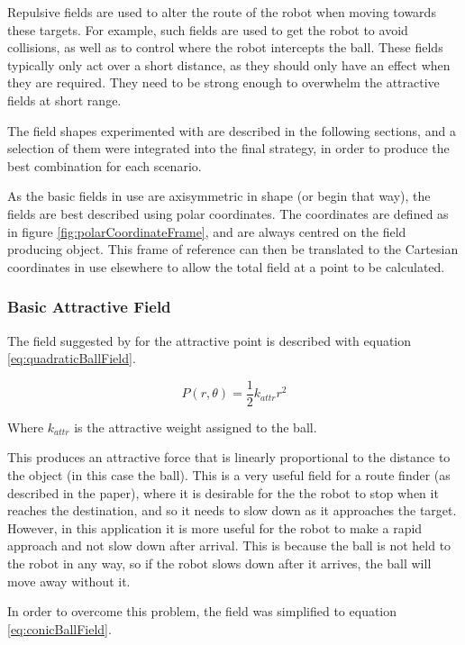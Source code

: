 \documentclass[10pt]{article} \usepackage[a4paper]{geometry}
\begin{document}
Repulsive fields are used to alter the route of the robot when moving towards
these targets. For example, such fields are used to get the robot to avoid
collisions, as well as to control where the robot intercepts the ball. These
fields typically only act over a short distance, as they should only have an
effect when they are required. They need to be strong enough to overwhelm the
attractive fields at short range.

The field shapes experimented with are described in the following sections, and
a selection of them were integrated into the final strategy, in order to produce
the best combination for each scenario.

As the basic fields in use are axisymmetric in shape (or begin that way), the
fields are best described using polar coordinates. The coordinates are defined
as in figure \ref{fig:polarCoordinateFrame}, and are always centred on the field
producing object. This frame of reference can then be translated to the
Cartesian coordinates in use elsewhere to allow the total field at a point to be
calculated.

\subsubsection{Basic Attractive Field\label{sub:Basic-Attractive-Field}}

The field suggested by \cite{intelligentAlgorithmPathPlanning} for the
attractive point is described with equation \ref{eq:quadraticBallField}.

\begin{equation}
P(r,\theta)=\frac{1}{2}k_{attr}r^{2}\label{eq:quadraticBallField}
\end{equation}

Where $k_{attr}$ is the attractive weight assigned to the ball.

This produces an attractive force that is linearly proportional to the distance
to the object (in this case the ball). This is a very useful field for a route
finder (as described in the paper), where it is desirable for the the robot to
stop when it reaches the destination, and so it needs to slow down as it
approaches the target. However, in this application it is more useful for the
robot to make a rapid approach and not slow down after arrival. This is because
the ball is not held to the robot in any way, so if the robot slows down after
it arrives, the ball will move away without it.

In order to overcome this problem, the field was simplified to equation
\ref{eq:conicBallField}.
\end{document}

